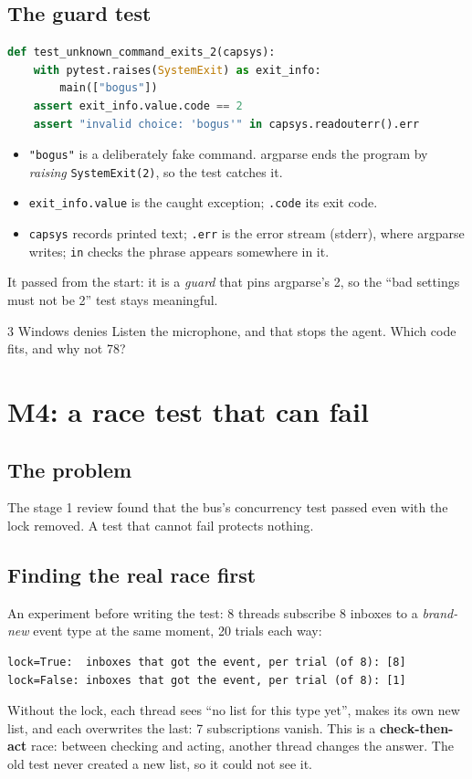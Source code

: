 \documentclass[11pt,a4paper]{article}
\begin{document}
\subsection{The guard test}
\begin{lstlisting}[language=Python]
def test_unknown_command_exits_2(capsys):
    with pytest.raises(SystemExit) as exit_info:
        main(["bogus"])
    assert exit_info.value.code == 2
    assert "invalid choice: 'bogus'" in capsys.readouterr().err
\end{lstlisting}
\begin{itemize}[nosep]
  \item \texttt{"bogus"} is a deliberately fake command. argparse ends the program by
        \emph{raising} \texttt{SystemExit(2)}, so the test catches it.
  \item \texttt{exit\_info.value} is the caught exception; \texttt{.code} its exit code.
  \item \texttt{capsys} records printed text; \texttt{.err} is the error stream (stderr), where
        argparse writes; \texttt{in} checks the phrase appears somewhere in it.
\end{itemize}
\noindent It passed from the start: it is a \emph{guard} that pins argparse's 2, so the
``bad settings must not be 2'' test stays meaningful.

\begin{quickcheck}{3}
Windows denies Listen the microphone, and that stops the agent. Which code fits, and why not 78?
\end{quickcheck}

\section{M4: a race test that can fail}
\subsection{The problem}
The stage 1 review found that the bus's concurrency test passed even with the lock removed. A test
that cannot fail protects nothing.

\subsection{Finding the real race first}
An experiment before writing the test: 8 threads subscribe 8 inboxes to a \emph{brand-new} event
type at the same moment, 20 trials each way:
\begin{lstlisting}
lock=True:  inboxes that got the event, per trial (of 8): [8]
lock=False: inboxes that got the event, per trial (of 8): [1]
\end{lstlisting}
\noindent Without the lock, each thread sees ``no list for this type yet'', makes its own new
list, and each overwrites the last: 7 subscriptions vanish. This is a
\textbf{check-then-act} race: between checking and acting, another thread changes the answer.
The old test never created a new list, so it could not see it.
\end{document}
